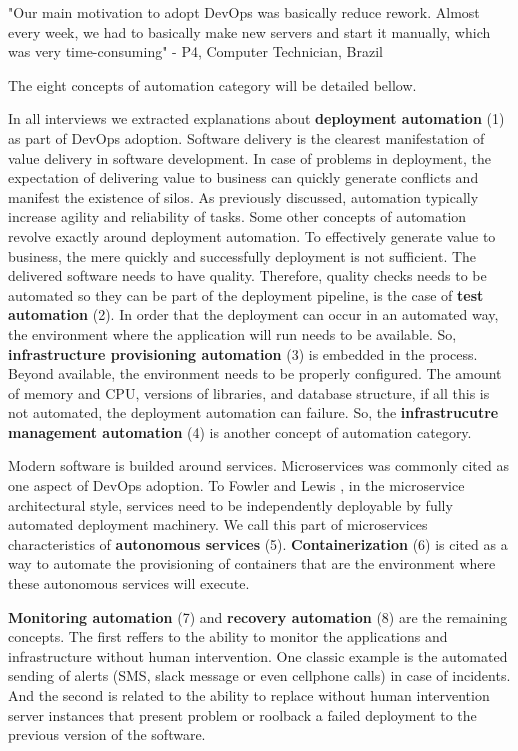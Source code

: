 "Our main motivation to adopt DevOps was basically reduce rework. Almost every
week, we had to basically make new servers and start it manually, which was
very time-consuming" - P4, Computer Technician, Brazil

The eight concepts of automation category will be detailed bellow.

In all interviews we extracted explanations about \textbf{deployment
automation} (1) as part of DevOps adoption. Software delivery is the clearest
manifestation of value delivery in software development. In case of problems
in deployment, the expectation of delivering value to business can quickly
generate conflicts and manifest the existence of silos. As previously discussed,
automation typically increase agility and reliability of tasks. Some other
concepts of automation revolve exactly around deployment automation. To
effectively generate value to business, the mere quickly and successfully
deployment is not sufficient. The delivered software needs to have quality.
Therefore, quality checks needs to be automated so they can be part of the
deployment pipeline, is the case of \textbf{test automation} (2). In order
that the deployment can occur in an automated way, the environment where the
application will run needs to be available. So, \textbf{infrastructure
provisioning automation} (3) is embedded in the process. Beyond available,
the environment needs to be properly configured. The amount of memory and CPU,
versions of libraries, and database structure, if all this is not automated,
the deployment automation can failure. So, the \textbf{infrastrucutre management
automation} (4) is another concept of automation category.

Modern software is builded around services. Microservices  was commonly cited
as one aspect of DevOps adoption. To Fowler and Lewis \cite{folwer}, in the
microservice architectural style, services need to be independently deployable
by fully automated deployment machinery. We call this part of microservices
characteristics of \textbf{autonomous services} (5). \textbf{Containerization}
(6) is cited as a way to automate the provisioning of containers that are the
environment where these autonomous services will execute.

\textbf{Monitoring automation} (7) and \textbf{recovery automation} (8) are the
remaining concepts. The first reffers to the ability to monitor the
applications and infrastructure without human intervention. One classic example
is the automated sending of alerts (SMS, slack message or even cellphone calls)
in case of incidents. And the second is related to the ability to replace
without human intervention server instances that present problem or roolback a
failed deployment to the previous version of the software.



